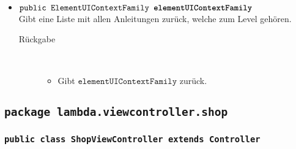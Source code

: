 \begin{description}
\begin{itemize}
		\item $\texttt{public ElementUIContextFamily \textbf{elementUIContextFamily}}$ \\ Gibt eine Liste mit allen Anleitungen zurück, welche zum Level gehören.
		\begin{description}
			\item[Rückgabe] \hfill \\
			\vspace{-.8cm}
			\begin{itemize}
				\item Gibt $\texttt{elementUIContextFamily}$ zurück.
			\end{itemize}
			\end{description}

		\end{itemize}
	\end{description}
		
	




\subsection{\texttt{package lambda.viewcontroller.shop}}

\subsubsection{\normalfont \texttt{public class \textbf{ShopViewController} extends Controller}}

